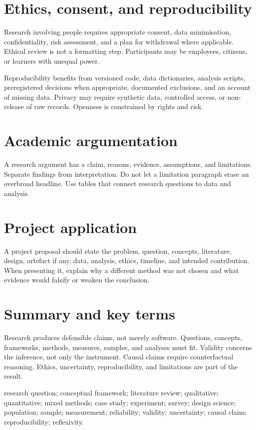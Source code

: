 \section{Ethics, consent, and reproducibility}
Research involving people requires appropriate consent, data minimisation, confidentiality, risk assessment, and a plan for withdrawal where applicable. Ethical review is not a formatting step. Participants may be employees, citizens, or learners with unequal power.

Reproducibility benefits from versioned code, data dictionaries, analysis scripts, preregistered decisions when appropriate, documented exclusions, and an account of missing data. Privacy may require synthetic data, controlled access, or non-release of raw records. Openness is constrained by rights and risk.

\section{Academic argumentation}
A research argument has a claim, reasons, evidence, assumptions, and limitations. Separate findings from interpretation. Do not let a limitation paragraph erase an overbroad headline. Use tables that connect research questions to data and analysis.

\section{Project application}
A project proposal should state the problem, question, concepts, literature, design, artefact if any, data, analysis, ethics, timeline, and intended contribution. When presenting it, explain why a different method was not chosen and what evidence would falsify or weaken the conclusion.

\section{Summary and key terms}
Research produces defensible claims, not merely software. Questions, concepts, frameworks, methods, measures, samples, and analyses must fit. Validity concerns the inference, not only the instrument. Causal claims require counterfactual reasoning. Ethics, uncertainty, reproducibility, and limitations are part of the result.

\begin{keyterms}research question; conceptual framework; literature review; qualitative; quantitative; mixed methods; case study; experiment; survey; design science; population; sample; measurement; reliability; validity; uncertainty; causal claim; reproducibility; reflexivity.\end{keyterms}

